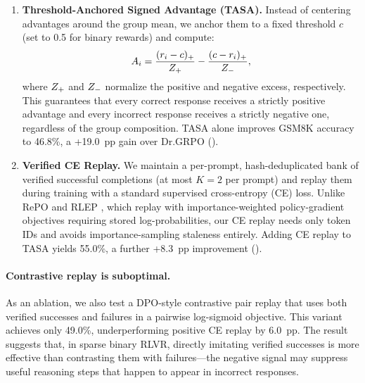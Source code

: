 \begin{enumerate}[leftmargin=*,topsep=2pt,itemsep=1pt]
\item \textbf{Threshold-Anchored Signed Advantage (TASA).}
Instead of centering advantages around the group mean, we anchor them to a fixed threshold $c$ (set to 0.5 for binary rewards) and compute:
\[
A_i = \frac{(r_i - c)_+}{Z_{+}} - \frac{(c - r_i)_+}{Z_{-}},
\]
where $Z_{+}$ and $Z_{-}$ normalize the positive and negative excess, respectively.
This guarantees that every correct response receives a strictly positive advantage and every incorrect response receives a strictly negative one, regardless of the group composition.
TASA alone improves GSM8K accuracy to 46.8\%, a +19.0~pp gain over Dr.GRPO ().

\item \textbf{Verified CE Replay.}
We maintain a per-prompt, hash-deduplicated bank of verified successful completions (at most $K{=}2$ per prompt) and replay them during training with a standard supervised cross-entropy (CE) loss.
Unlike RePO \citep{li2025repo} and RLEP \citep{zhang2025rlep}, which replay with importance-weighted policy-gradient objectives requiring stored log-probabilities, our CE replay needs only token IDs and avoids importance-sampling staleness entirely.
Adding CE replay to TASA yields 55.0\%, a further +8.3~pp improvement ().
\end{enumerate}

\paragraph{Contrastive replay is suboptimal.}
As an ablation, we also test a DPO-style \citep{rafailov2023direct} contrastive pair replay that uses both verified successes and failures in a pairwise log-sigmoid objective.
This variant achieves only 49.0\%, underperforming positive CE replay by 6.0~pp.
The result suggests that, in sparse binary RLVR, directly imitating verified successes is more effective than contrasting them with failures---the negative signal may suppress useful reasoning steps that happen to appear in incorrect responses.

